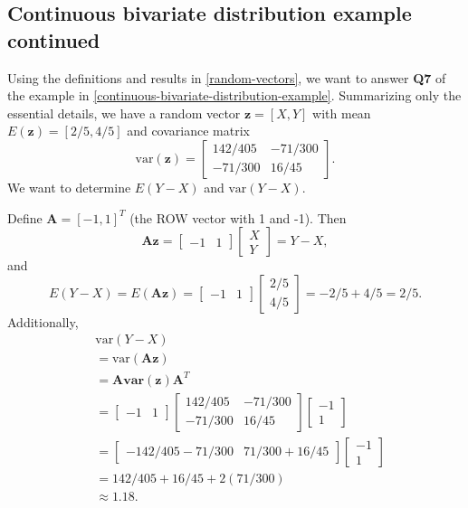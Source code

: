 \documentclass[
]{book}
\theoremstyle{definition}
\theoremstyle{definition}
\theoremstyle{definition}
\theoremstyle{definition}
\theoremstyle{remark}
\begin{document}
\hypertarget{continuous-bivariate-distribution-example-continued}{%
\subsection{Continuous bivariate distribution example continued}\label{continuous-bivariate-distribution-example-continued}}

Using the definitions and results in \ref{random-vectors}, we want to answer \textbf{Q7} of the example in \ref{continuous-bivariate-distribution-example}. Summarizing only the essential details, we have a random vector \(\mathbf{z}=[X, Y]\) with mean \(E(\mathbf{z})=[2/5, 4/5]\) and covariance matrix
\[
\mathrm{var}(\mathbf{z})=
\begin{bmatrix}
142/405 & -71/300 \\
-71/300 & 16/45
\end{bmatrix}.
\] We want to determine \(E(Y-X)\) and \(\mathrm{var}(Y-X)\).

Define \(\mathbf{A}=[-1, 1]^T\) (the ROW vector with 1 and -1). Then
\[
\mathbf{Az}=\begin{bmatrix}-1 & 1\end{bmatrix}
\begin{bmatrix}
X\\
Y
\end{bmatrix}
=Y-X,\]
and
\[
E(Y-X)=E(\mathbf{Az})=\begin{bmatrix}-1 & 1\end{bmatrix}
\begin{bmatrix}
2/5\\
4/5
\end{bmatrix}=-2/5+4/5=2/5.
\]
Additionally,
\[
\begin{aligned}
& \mathrm{var}(Y-X) \\
&=\mathrm{var}(\mathbf{Az}) \\
&=\mathbf{A}\mathbf{var}(\mathbf{z})\mathbf{A}^T \\
&=
\begin{bmatrix}
-1 & 1
\end{bmatrix}
\begin{bmatrix}
142/405 & -71/300 \\
-71/300 & 16/45
\end{bmatrix}
\begin{bmatrix}
-1 \\ 1
\end{bmatrix} \\
&= \begin{bmatrix}
-142/405-71/300 & 71/300+16/45
\end{bmatrix}
\begin{bmatrix}
-1 \\ 1
\end{bmatrix} \\
&= 142/405 + 16/45 + 2(71/300) \\
&\approx 1.18.
\end{aligned}
\]
\end{document}
